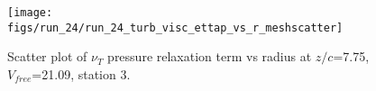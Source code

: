 \begin{figure}[H]
\centering
\texttt{[image: figs/run\_24/run\_24\_turb\_visc\_ettap\_vs\_r\_meshscatter]}
\caption{Scatter plot of $\nu_T$ pressure relaxation term vs radius at $z/c$=7.75, $V_{free}$=21.09, station 3.}
\label{fig:run_24_turb_visc_ettap_vs_r_meshscatter}
\end{figure}


